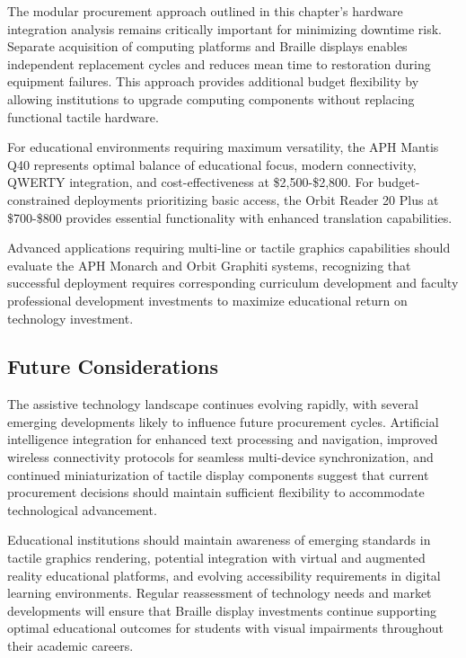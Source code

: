 The modular procurement approach outlined in this chapter's hardware integration analysis remains critically important for minimizing downtime risk. Separate acquisition of computing platforms and Braille displays enables independent replacement cycles and reduces mean time to restoration during equipment failures. This approach provides additional budget flexibility by allowing institutions to upgrade computing components without replacing functional tactile hardware.

For educational environments requiring maximum versatility, the APH Mantis Q40 represents optimal balance of educational focus, modern connectivity, QWERTY integration, and cost-effectiveness at \$2,500-\$2,800. For budget-constrained deployments prioritizing basic access, the Orbit Reader 20 Plus at \$700-\$800 provides essential functionality with enhanced translation capabilities.

Advanced applications requiring multi-line or tactile graphics capabilities should evaluate the APH Monarch and Orbit Graphiti systems, recognizing that successful deployment requires corresponding curriculum development and faculty professional development investments to maximize educational return on technology investment.

\subsection{Future Considerations}\label{ch3:ssec:future-considerations}
The assistive technology landscape continues evolving rapidly, with several emerging developments likely to influence future procurement cycles. Artificial intelligence integration for enhanced text processing and navigation, improved wireless connectivity protocols for seamless multi-device synchronization, and continued miniaturization of tactile display components suggest that current procurement decisions should maintain sufficient flexibility to accommodate technological advancement.

Educational institutions should maintain awareness of emerging standards in tactile graphics rendering, potential integration with virtual and augmented reality educational platforms, and evolving accessibility requirements in digital learning environments. Regular reassessment of technology needs and market developments will ensure that Braille display investments continue supporting optimal educational outcomes for students with visual impairments throughout their academic careers.